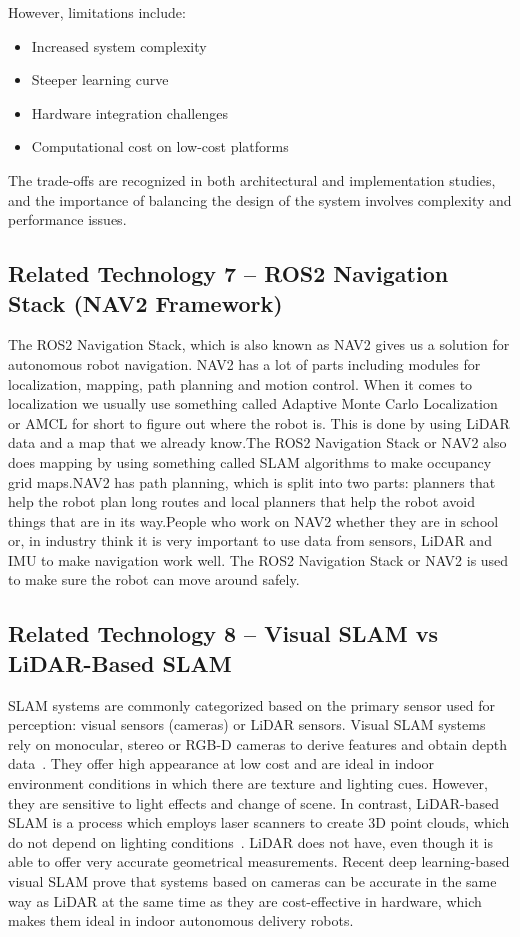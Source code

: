 However, limitations include:

\begin{itemize}
\item Increased system complexity
\item Steeper learning curve
\item Hardware integration challenges
\item Computational cost on low-cost platforms
\end{itemize}

The trade-offs are recognized in both architectural and implementation studies, and the importance of balancing the design of the system involves complexity and performance issues.


\subsection{Related Technology 7 -- ROS2 Navigation Stack (NAV2 Framework)}

The ROS2 Navigation Stack, which is also known as NAV2 gives us a solution for autonomous robot navigation. NAV2 has a lot of parts including modules for localization, mapping, path planning and motion control. When it comes to localization we usually use something called Adaptive Monte Carlo Localization or AMCL for short to figure out where the robot is. This is done by using LiDAR data and a map that we already know.The ROS2 Navigation Stack or NAV2 also does mapping by using something called SLAM algorithms to make occupancy grid maps.NAV2 has path planning, which is split into two parts: planners that help the robot plan long routes and local planners that help the robot avoid things that are in its way.People who work on NAV2 whether they are in school or, in industry think it is very important to use data from sensors, LiDAR and IMU to make navigation work well. The ROS2 Navigation Stack or NAV2 is used to make sure the robot can move around safely.
\subsection{Related Technology 8 -- Visual SLAM vs LiDAR-Based SLAM}

SLAM systems are commonly categorized based on the primary sensor used for perception: visual sensors (cameras) or LiDAR sensors. Visual SLAM systems rely on monocular, stereo or RGB-D cameras to derive features and obtain depth data~\cite{campos2021orb}. They offer high appearance at low cost and are ideal in indoor environment conditions in which there are texture and lighting cues. However, they are sensitive to light effects and change of scene. In contrast, LiDAR-based SLAM is a process which employs laser scanners to create 3D point clouds, which do not depend on lighting conditions~\cite{li2021indoor}. LiDAR does not have, even though it is able to offer very accurate geometrical measurements. Recent deep learning-based visual SLAM prove that systems based on cameras can be accurate in the same way as LiDAR at the same time as they are cost-effective in hardware, which makes them ideal in indoor autonomous delivery robots.

